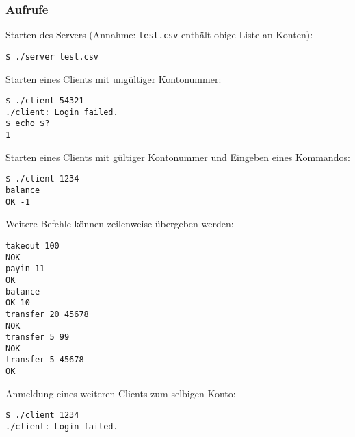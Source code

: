 \subsubsection*{Aufrufe}
Starten des Servers (Annahme: \texttt{test.csv} enthält obige Liste an Konten):
\begin{verbatim}
$ ./server test.csv
\end{verbatim}
%
Starten eines Clients mit ungültiger Kontonummer:
\begin{verbatim}
$ ./client 54321
./client: Login failed.
$ echo $?
1
\end{verbatim}
%
Starten eines Clients mit gültiger Kontonummer und Eingeben eines Kommandos:
%
\begin{verbatim}
$ ./client 1234
balance
OK -1
\end{verbatim}
%
Weitere Befehle können zeilenweise übergeben werden:
\begin{verbatim}
takeout 100
NOK
payin 11
OK
balance
OK 10
transfer 20 45678
NOK
transfer 5 99
NOK
transfer 5 45678
OK
\end{verbatim}
%
Anmeldung eines weiteren Clients zum selbigen Konto:
\begin{verbatim}
$ ./client 1234
./client: Login failed.
\end{verbatim}

\osueguidelinesthree



